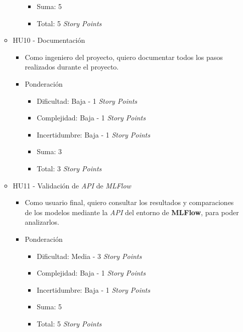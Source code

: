 \documentclass[
11pt, %
]{charter}
\begin{document}
\begin{itemize}
\begin{itemize}
\begin{itemize}
\begin{itemize}
                \item Suma: 5
                \item Total: 5 \textit{Story Points}
            \end{itemize}
        \end{itemize}
      \item HU10 - Documentación
        \begin{itemize}
            \item Como ingeniero del proyecto, quiero documentar todos los pasos realizados durante el proyecto.
            \item Ponderación
            \begin{itemize}
                \item Dificultad: Baja - 1 \textit{Story Points}
                \item Complejidad: Baja - 1 \textit{Story Points}
                \item Incertidumbre: Baja - 1 \textit{Story Points}
                \item Suma: 3
                \item Total: 3 \textit{Story Points}
            \end{itemize}
        \end{itemize}
      \item HU11 - Validación de \textit{API} de \textit{MLFlow}
        \begin{itemize}
            \item Como usuario final, quiero consultar los resultados y comparaciones de los modelos mediante la \textit{API} del entorno de \textbf{MLFlow}, para poder analizarlos.
            \item Ponderación
            \begin{itemize}
                \item Dificultad: Media - 3 \textit{Story Points}
                \item Complejidad: Baja - 1 \textit{Story Points}
                \item Incertidumbre: Baja - 1 \textit{Story Points}
                \item Suma: 5
                \item Total: 5 \textit{Story Points}
            \end{itemize}
        \end{itemize}        
    \end{itemize}
\end{itemize}
\end{document}
